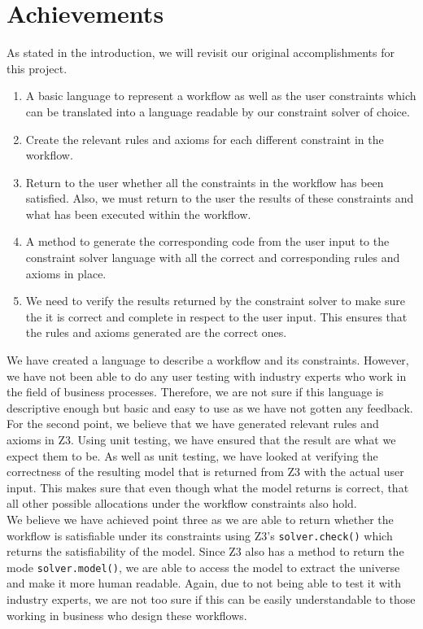 \documentclass[a4paper]{report}
\begin{document}
\section{Achievements}
As stated in the introduction, we will revisit our original accomplishments for this project.
\begin{enumerate}
\item A basic language to represent a workflow as well as the user constraints which can be translated into a language readable by our constraint solver of choice.
\item Create the relevant rules and axioms for each different constraint in the workflow.
\item Return to the user whether all the constraints in the workflow has been satisfied. Also, we must return to the user the results of these constraints and what has been executed within the workflow.
\item A method to generate the corresponding code from the user input to the constraint solver language with all the correct and corresponding rules and axioms in place. 
\item We need to verify the results returned by the constraint solver to make sure the it is correct and complete in respect to the user input. This ensures that the rules and axioms generated are the correct ones. 
\end{enumerate}

We have created a language to describe  a workflow and its constraints. However, we have not been able to do any user testing with industry experts who work in the field of business processes. Therefore, we are not sure if this language is descriptive enough but basic and easy to use as we have not gotten any feedback. \\

For the second point, we believe that we have generated relevant rules and axioms in Z3. Using unit testing, we have ensured that the result are what we expect them to be. As well as unit testing, we have looked at verifying the correctness of the resulting model that is returned from Z3 with the actual user input. This makes sure that even though what the model returns is correct, that all other possible allocations under the workflow constraints also hold. \\

We believe we have achieved point three as we are able to return whether the workflow is satisfiable under its constraints using Z3's \texttt{solver.check()} which returns the satisfiability of the model. Since Z3 also has a method to return the mode \texttt{solver.model()}, we are able to access the model to extract the universe and make it more human readable. Again, due to not being able to test it with industry experts, we are not too sure if this can be easily understandable to those working in business who design these workflows.  \\
\end{document}
